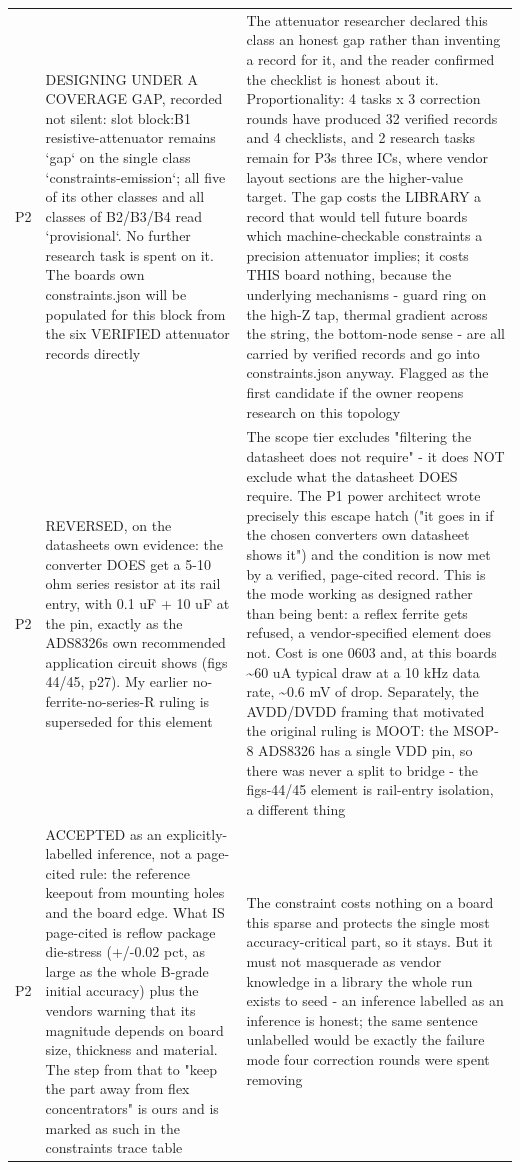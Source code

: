 \documentclass[11pt,a4paper]{article}
\begin{document}
{\begin{longtable}{lp{5.2cm}p{7.2cm}}
P2 & DESIGNING UNDER A COVERAGE GAP, recorded not silent: slot block:B1 resistive-attenuator remains `gap` on the single class `constraints-emission`; all five of its other classes and all classes of B2/B3/B4 read `provisional`. No further research task is spent on it. The boards own constraints.json will be populated for this block from the six VERIFIED attenuator records directly & The attenuator researcher declared this class an honest gap rather than inventing a record for it, and the reader confirmed the checklist is honest about it. Proportionality: 4 tasks x 3 correction rounds have produced 32 verified records and 4 checklists, and 2 research tasks remain for P3s three ICs, where vendor layout sections are the higher-value target. The gap costs the LIBRARY a record that would tell future boards which machine-checkable constraints a precision attenuator implies; it costs THIS board nothing, because the underlying mechanisms - guard ring on the high-Z tap, thermal gradient across the string, the bottom-node sense - are all carried by verified records and go into constraints.json anyway. Flagged as the first candidate if the owner reopens research on this topology \\
P2 & REVERSED, on the datasheets own evidence: the converter DOES get a 5-10 ohm series resistor at its rail entry, with 0.1 uF + 10 uF at the pin, exactly as the ADS8326s own recommended application circuit shows (figs 44/45, p27). My earlier no-ferrite-no-series-R ruling is superseded for this element & The scope tier excludes "filtering the datasheet does not require" - it does NOT exclude what the datasheet DOES require. The P1 power architect wrote precisely this escape hatch ("it goes in if the chosen converters own datasheet shows it") and the condition is now met by a verified, page-cited record. This is the mode working as designed rather than being bent: a reflex ferrite gets refused, a vendor-specified element does not. Cost is one 0603 and, at this boards \textasciitilde{}60 uA typical draw at a 10 kHz data rate, \textasciitilde{}0.6 mV of drop. Separately, the AVDD/DVDD framing that motivated the original ruling is MOOT: the MSOP-8 ADS8326 has a single VDD pin, so there was never a split to bridge - the figs-44/45 element is rail-entry isolation, a different thing \\
P2 & ACCEPTED as an explicitly-labelled inference, not a page-cited rule: the reference keepout from mounting holes and the board edge. What IS page-cited is reflow package die-stress (+/-0.02 pct, as large as the whole B-grade initial accuracy) plus the vendors warning that its magnitude depends on board size, thickness and material. The step from that to "keep the part away from flex concentrators" is ours and is marked as such in the constraints trace table & The constraint costs nothing on a board this sparse and protects the single most accuracy-critical part, so it stays. But it must not masquerade as vendor knowledge in a library the whole run exists to seed - an inference labelled as an inference is honest; the same sentence unlabelled would be exactly the failure mode four correction rounds were spent removing \\

\end{longtable}}
\end{document}
